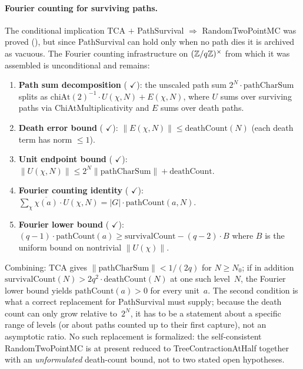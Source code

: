 \paragraph{Fourier counting for surviving paths.}
The conditional implication
TCA $+$ PathSurvival $\Rightarrow$ RandomTwoPointMC was proved
(),
but since PathSurvival can hold only when no path dies it is archived
as vacuous.  The Fourier counting infrastructure on
$(\mathbb{Z}/q\mathbb{Z})^\times$ from which it was assembled is unconditional and
remains:
\begin{enumerate}[nosep]
\item \textbf{Path sum decomposition}
  (
  {\color{leanink}$\checkmark$}):
  the unscaled path sum
  $2^N \cdot \mathrm{pathCharSum}$ splits as
  $\mathrm{chiAt}(2)^{-1}\cdot U(\chi,N) + E(\chi,N)$,
  where $U$ sums over surviving paths via ChiAtMultiplicativity and
  $E$ sums over death paths.

\item \textbf{Death error bound}
  (
  {\color{leanink}$\checkmark$}):
  $\|E(\chi,N)\| \leq \mathrm{deathCount}(N)$
  (each death term has norm $\leq 1$).

\item \textbf{Unit endpoint bound}
  (
  {\color{leanink}$\checkmark$}):
  $\|U(\chi,N)\| \leq 2^N\|\mathrm{pathCharSum}\| + \mathrm{deathCount}$.

\item \textbf{Fourier counting identity}
  (
  {\color{leanink}$\checkmark$}):
  $\sum_\chi \overline{\chi(a)} \cdot U(\chi,N)
  = |G| \cdot \mathrm{pathCount}(a,N)$.

\item \textbf{Fourier lower bound}
  (
  {\color{leanink}$\checkmark$}):
  $(q{-}1)\cdot\mathrm{pathCount}(a) \geq
  \mathrm{survivalCount} - (q{-}2)\cdot B$
  where $B$ is the uniform bound on nontrivial $\|U(\chi)\|$.
\end{enumerate}
Combining: TCA gives $\|\mathrm{pathCharSum}\| < 1/(2q)$ for
$N \geq N_0$; if in addition
$\mathrm{survivalCount}(N) > 2q^2 \cdot \mathrm{deathCount}(N)$ at one
such level~$N$, the Fourier lower bound yields
$\mathrm{pathCount}(a) > 0$ for every unit~$a$.  The second condition
is what a correct replacement for PathSurvival must supply; because the
death count can only grow relative to~$2^N$, it has to be a statement
about a specific range of levels (or about paths counted up to their
first capture), not an asymptotic ratio.  No such replacement is
formalized: the self-consistent RandomTwoPointMC is at present reduced
to TreeContractionAtHalf together with an \emph{unformulated} death-count
bound, not to two stated open hypotheses.

